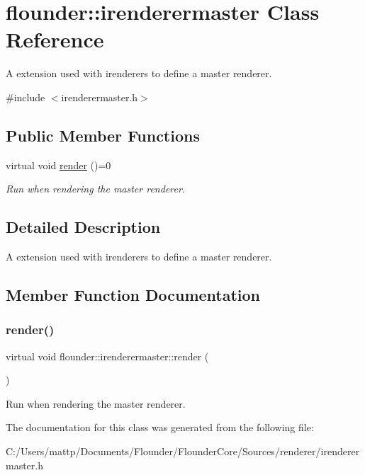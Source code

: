 \hypertarget{classflounder_1_1irenderermaster}{}\section{flounder\+:\+:irenderermaster Class Reference}
\label{classflounder_1_1irenderermaster}


A extension used with irenderers to define a master renderer.  




{\ttfamily \#include $<$irenderermaster.\+h$>$}

\subsection*{Public Member Functions}
\begin{DoxyCompactItemize}
\item 
virtual void \hyperlink{classflounder_1_1irenderermaster_ae5719349eb4b111889156f9560d9c3e0}{render} ()=0
\begin{DoxyCompactList}\small\item\em Run when rendering the master renderer. \end{DoxyCompactList}\end{DoxyCompactItemize}


\subsection{Detailed Description}
A extension used with irenderers to define a master renderer. 



\subsection{Member Function Documentation}
\mbox{\label{classflounder_1_1irenderermaster_ae5719349eb4b111889156f9560d9c3e0}} 
\subsubsection{\texorpdfstring{render()}{render()}}
{\footnotesize\ttfamily virtual void flounder\+::irenderermaster\+::render (\begin{DoxyParamCaption}{ }\end{DoxyParamCaption})\hspace{0.3cm}{\ttfamily [pure virtual]}}



Run when rendering the master renderer. 



The documentation for this class was generated from the following file\+:\begin{DoxyCompactItemize}
\item 
C\+:/\+Users/mattp/\+Documents/\+Flounder/\+Flounder\+Core/\+Sources/renderer/irenderermaster.\+h\end{DoxyCompactItemize}
